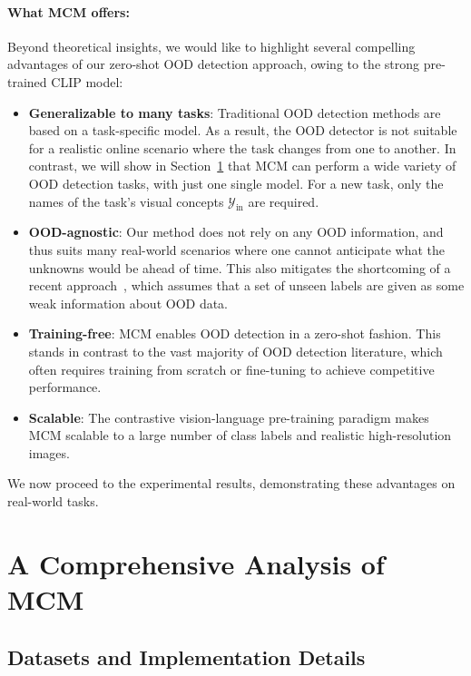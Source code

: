 \documentclass{article}
\begin{document}
\paragraph{What MCM offers:} Beyond theoretical insights, we would like to highlight several compelling advantages of our zero-shot OOD detection approach, owing to the strong pre-trained CLIP model:
\begin{itemize}[leftmargin=*,topsep=4pt,itemsep=4pt,parsep=0pt]
    \item \textbf{Generalizable to many tasks}: Traditional OOD detection methods are based on a task-specific model. As a result, the OOD detector is not suitable for a realistic online scenario where the task changes from one to another. In contrast, we will show in Section~\ref{sec:exp} that MCM can perform a wide variety of OOD detection tasks, with just one single model. For a new task, only the names of the task’s visual concepts $\mathcal{Y}_\text{in}$ are required. 
    \item \textbf{OOD-agnostic}:  Our method does not rely on any OOD  information, and thus suits many real-world scenarios where one cannot anticipate what the unknowns would be ahead of time. This also mitigates the shortcoming of a recent  approach~\cite{fort2021exploring}, which assumes that a set of unseen labels are given as some weak information about OOD data.  
    \item \textbf{Training-free}: MCM enables OOD detection in a zero-shot fashion. This stands in contrast to the vast majority of OOD detection literature, which often requires training from scratch or fine-tuning to achieve competitive performance. 
    \item \textbf{Scalable}: The contrastive vision-language pre-training paradigm makes MCM scalable to a large number of class labels and realistic high-resolution images.
\end{itemize}

We now proceed to the experimental results, demonstrating these advantages on real-world tasks. 


\section{A Comprehensive Analysis of MCM}
\label{sec:exp}
\subsection{Datasets and Implementation Details}
\end{document}

